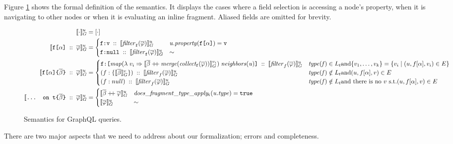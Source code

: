 Figure \ref{fig:semantics} shows the formal definition of the semantics. It displays the cases where a field selection is accessing a node's property, when it is navigating to other nodes or when it is evaluating an inline fragment. Aliased fields are omitted for brevity.

\begin{figure}
    \centering
    \begin{align}
    \llbracket \cdot \rrbracket^{u}_{G} &= [\cdot] \\
    \llbracket \texttt{f[}\alpha\texttt{]}\; ::\; \overline{\varphi} \rrbracket^{u}_{G} &= \begin{cases}
    \texttt{f}\texttt{:}\texttt{v} \; ::\; \llbracket \mathit{filter}_{\texttt{f}}(\overline{\varphi}) \rrbracket^{u}_{G}  & \mathit{u.property}(\texttt{f[}\alpha\texttt{]}) = \texttt{v} \\
    \texttt{f}\texttt{:}\texttt{null} \; :: \; \llbracket \mathit{filter}_{\texttt{f}}(\overline{\varphi}) \rrbracket^{u}_{G} & \sim
    \end{cases}\\
    \llbracket \texttt{f[}\alpha\texttt{]} \texttt{\{}\overline{\beta}\texttt{\}} \; ::\; \overline{\varphi} \rrbracket^{u}_{G} &=
    \begin{cases}
    \texttt{f}\texttt{:}\texttt{[} \mathit{map} (\lambda\; v_{i} \Rightarrow \llbracket \overline{\beta} \mathbin{+\mkern-5mu+} \mathit{merge (collect_{\texttt{f}} (\overline{\varphi}))} \rrbracket^{v_{i}}_{G})\; \mathit{neighbors(u)} \texttt{]} \; :: \; \llbracket \mathit{filter}_{f}(\overline{\varphi}) \rrbracket^{u}_{G}  & \mathit{type(f)} \in L_{t} \text{and} \{v_{1}, \ldots, v_{k}\} = \{v_{i} \mid (u, f[\alpha], v_{i}) \in E\} \\
    (f:\{\llbracket \overline{\beta} \rrbracket^{v}_{G}\})\; :: \; \llbracket \mathit{filter}_{f}(\overline{\varphi}) \rrbracket^{u}_{G}  & \mathit{type(f)} \notin L_{t} \text{and} (u, f[\alpha], v) \in E \\
    (f:null)\; :: \; \llbracket \mathit{filter}_{f}(\overline{\varphi}) \rrbracket^{u}_{G} & \mathit{type(f)} \notin L_{t} \text{and there is no } v \text{ s.t.} (u, f[\alpha], v) \in E \\
    \end{cases}\\
    \llbracket \texttt{... on t}\texttt{\{}\overline{\beta}\texttt{\}}\; ::\; \overline{\varphi} \rrbracket^{u}_{G} &= \begin{cases}
    \llbracket \overline{\beta} \mathbin{+\mkern-5mu+} \overline{\varphi} \rrbracket^{u}_{G} & \mathit{does\_fragment\_type\_apply_{\texttt{t}}(u.type)} = \texttt{true}\\
    \llbracket \overline{\varphi} \rrbracket^{u}_{G} & \sim
    \end{cases}
    \end{align}
    \caption{Semantics for GraphQL queries.}
    \label{fig:semantics}
\end{figure}
There are two major aspects that we need to address about our formalization; errors and completeness.

